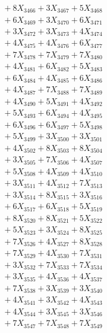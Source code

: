 \documentclass[a4paper,10pt]{article}
\begin{document}
{\begin{align}
&\;  + 8 X_{3466} + 3 X_{3467} + 5 X_{3468} \\[0.3ex]
&\;  + 6 X_{3469} + 3 X_{3470} + 6 X_{3471} \\[0.3ex]
&\;  + 3 X_{3472} + 3 X_{3473} + 4 X_{3474} \\[0.3ex]
&\;  + 4 X_{3475} + 4 X_{3476} + 6 X_{3477} \\[0.3ex]
&\;  + 7 X_{3478} + 7 X_{3479} + 7 X_{3480} \\[0.3ex]
&\;  + 4 X_{3481} + 6 X_{3482} + 5 X_{3483} \\[0.3ex]
&\;  + 6 X_{3484} + 4 X_{3485} + 6 X_{3486} \\[0.3ex]
&\;  + 4 X_{3487} + 7 X_{3488} + 7 X_{3489} \\[0.5ex]\allowbreak
&\;  + 4 X_{3490} + 5 X_{3491} + 4 X_{3492} \\[0.3ex]
&\;  + 5 X_{3493} + 6 X_{3494} + 4 X_{3495} \\[0.3ex]
&\;  + 6 X_{3496} + 6 X_{3497} + 5 X_{3498} \\[0.3ex]
&\;  + 5 X_{3499} + 3 X_{3500} + 3 X_{3501} \\[0.3ex]
&\;  + 4 X_{3502} + 8 X_{3503} + 8 X_{3504} \\[0.3ex]
&\;  + 3 X_{3505} + 7 X_{3506} + 4 X_{3507} \\[0.3ex]
&\;  + 5 X_{3508} + 4 X_{3509} + 4 X_{3510} \\[0.3ex]
&\;  + 3 X_{3511} + 4 X_{3512} + 7 X_{3513} \\[0.3ex]
&\;  + 3 X_{3514} + 8 X_{3515} + 3 X_{3516} \\[0.3ex]
&\;  + 6 X_{3517} + 6 X_{3518} + 5 X_{3519} \\[0.5ex]\allowbreak
&\;  + 8 X_{3520} + 8 X_{3521} + 5 X_{3522} \\[0.3ex]
&\;  + 5 X_{3523} + 3 X_{3524} + 8 X_{3525} \\[0.3ex]
&\;  + 7 X_{3526} + 4 X_{3527} + 8 X_{3528} \\[0.3ex]
&\;  + 7 X_{3529} + 4 X_{3530} + 7 X_{3531} \\[0.3ex]
&\;  + 3 X_{3532} + 7 X_{3533} + 7 X_{3534} \\[0.3ex]
&\;  + 3 X_{3535} + 4 X_{3536} + 4 X_{3537} \\[0.3ex]
&\;  + 7 X_{3538} + 3 X_{3539} + 3 X_{3540} \\[0.3ex]
&\;  + 4 X_{3541} + 3 X_{3542} + 4 X_{3543} \\[0.3ex]
&\;  + 4 X_{3544} + 3 X_{3545} + 3 X_{3546} \\[0.3ex]
&\;  + 7 X_{3547} + 7 X_{3548} + 7 X_{3549} \\[0.5ex]\allowbreak

\end{align}}
\end{document}
